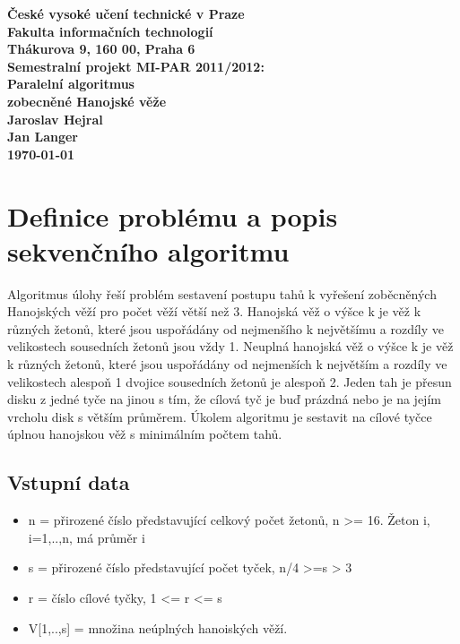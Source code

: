 \documentclass[12pt]{article}
\begin{document}

\begin{center}
\bf České vysoké učení technické v Praze\\[2mm]
	Fakulta informačních technologií\\[2mm]
	Thákurova 9, 160 00, Praha 6\\[15mm]
	\textbf{Semestralní projekt MI-PAR 2011/2012:\\
    Paralelní algoritmus \\
    zobecněné Hanojské věže}\\[5mm]
       Jaroslav Hejral\\
       Jan Langer\\[2mm]
\today\\[12mm]
\end{center}

\section{Definice problému a popis sekvenčního algoritmu}
Algoritmus úlohy řeší problém sestavení postupu tahů k vyřešení zoběcněných Hanojských věží pro počet věží větší než 3. Hanojská věž o výšce k je věž k různých žetonů, které jsou uspořádány od nejmenšího k největšímu a rozdíly ve velikostech sousedních žetonů jsou vždy 1. Neuplná hanojská věž o výšce k je věž k různých žetonů, které jsou uspořádány od nejmenších k největším a rozdíly ve velikostech alespoň 1 dvojice sousedních žetonů je alespoň 2. Jeden tah je přesun disku z jedné tyče na jinou s tím, že cílová tyč je buď prázdná nebo je na jejím vrcholu disk s větším průměrem. Úkolem algoritmu je sestavit na cílové tyčce úplnou hanojskou věž s minimálním počtem tahů.

\subsection{Vstupní data}
\begin{itemize}
\item n = přirozené číslo představující celkový počet žetonů, n >= 16. Žeton i, i=1,..,n, má průměr i
\item s = přirozené číslo představující počet tyček, n/4 >=s > 3
\item r = číslo cílové tyčky, 1 <= r <= s
\item V[1,..,s] = množina neúplných hanoiských věží.
\end{itemize}
\end{document}
